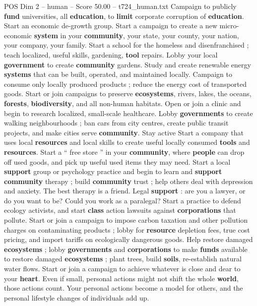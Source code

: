 \begin{textsample}{POS Dim 2 – human – Score 50.00 – t724\_human.txt}
Campaign to publicly \textbf{fund} universities, all \textbf{education}, to \textbf{limit} corporate corruption of \textbf{education}.
Start an economic de-growth group.
Start a campaign to create a new micro-economic \textbf{system} in your \textbf{community}, your state, your county, your nation, your company, your family.
Start a school for the homeless and disenfranchised ; teach localized, useful skills, gardening, \textbf{tool} repairs.
Lobby your local \textbf{government} to create \textbf{community} gardens.
Study and create renewable energy \textbf{systems} that can be built, operated, and maintained locally.
Campaign to consume only locally produced products ; reduce the energy cost of transported goods.
Start or join campaigns to preserve \textbf{ecosystems}, rivers, lakes, the oceans, \textbf{forests}, \textbf{biodiversity}, and all non-human habitats.
Open or join a clinic and begin to research localized, small-scale healthcare.
Lobby \textbf{governments} to create walking neighbourhoods ; ban cars from city centres, create public transit projects, and make cities serve \textbf{community}.
Stay active Start a company that uses local \textbf{resources} and local skills to create useful locally consumed \textbf{tools} and \textbf{resources}.
Start a “ free store ” in your \textbf{community}, where \textbf{people} can drop off used goods, and pick up useful used items they may need.
Start a local \textbf{support} group or psychology practice and begin to learn and \textbf{support} \textbf{community} therapy ; build \textbf{community} trust ; help others deal with depression and anxiety.
The best therapy is a friend.
Legal \textbf{support} : are you a lawyer, or do you want to be?
Could you work as a paralegal?
Start a practice to defend ecology activists, and start \textbf{class} action lawsuits against \textbf{corporations} that pollute.
Start or join a campaign to impose carbon taxation and other pollution charges on contaminating products ; lobby for \textbf{resource} depletion fees, true cost pricing, and import tariffs on ecologically dangerous goods.
Help restore damaged \textbf{ecosystems} ; lobby \textbf{governments} and \textbf{corporations} to make \textbf{funds} available to restore damaged \textbf{ecosystems} ; plant trees, build \textbf{soils}, re-establish natural water flows.
Start or join a campaign to achieve whatever is close and dear to your \textbf{heart}.
Even if small, personal actions might not shift the whole \textbf{world}, those actions count.
Your personal actions become a model for others, and the personal lifestyle changes of individuals add up.

\end{textsample}
